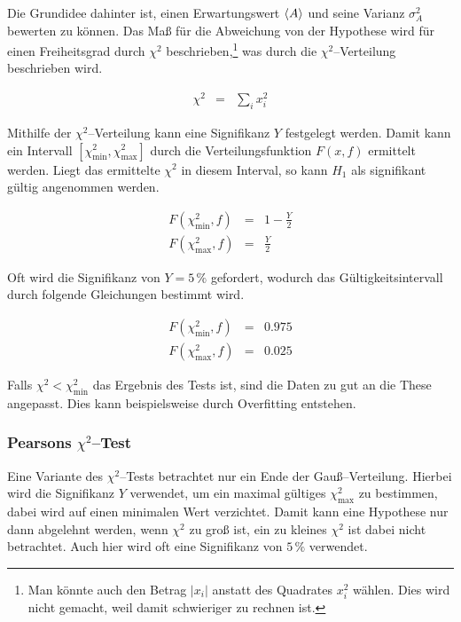 \documentclass[12pt,a4paper]{scrartcl}
\numberwithin{equation}{section} %
\begin{document}
Die Grundidee dahinter ist, einen Erwartungswert $\expval{A}$ und seine Varianz $\sigma_A^2$ bewerten zu können. Das Maß für die Abweichung von der Hypothese wird für einen Freiheitsgrad durch $\chi^2$ beschrieben,\footnote{Man könnte auch den Betrag $|x_i|$   anstatt des Quadrates $x_i^2$ wählen. Dies wird nicht gemacht, weil   damit schwieriger zu rechnen ist.} was durch die $\chi^2$--Verteilung beschrieben wird.

\begin{eqnarray}
    \chi^2 &=& \sum_i x_i^2
\end{eqnarray}

\noindent
Mithilfe der $\chi^2$--Verteilung kann eine Signifikanz $Y$ festgelegt werden. Damit kann ein Intervall $[\chi^2_\mathrm{min}, \chi^2_\mathrm{max}]$ durch die Verteilungsfunktion $F(x, f)$ ermittelt werden. Liegt das ermittelte $\chi^2$ in diesem Interval, so kann $H_1$ als signifikant gültig angenommen werden.

\begin{eqnarray}
    F(\chi^2_\mathrm{min}, f) &=& 1 - \frac{Y}{2} \\
    F(\chi^2_\mathrm{max}, f) &=& \frac{Y}{2}
\end{eqnarray}

\noindent
Oft wird die Signifikanz von $Y=5\,\%$ gefordert, wodurch das Gültigkeitsintervall durch folgende Gleichungen bestimmt wird.

\begin{eqnarray}
    F(\chi^2_\mathrm{min}, f) &=& 0.975 \label{eq:ChiMinFormula} \\
    F(\chi^2_\mathrm{max}, f) &=& 0.025 \label{eq:ChiMaxFormula}
\end{eqnarray}

\noindent
Falls $\chi^2<\chi^2_\mathrm{min}$ das Ergebnis des Tests ist, sind die Daten zu gut an die These angepasst. Dies kann beispielsweise durch Overfitting entstehen.

\hypertarget{pearsons-chi2test}{\subsubsection{Pearsons $\chi^2$--Test}\label{pearsons-chi2test}}

Eine Variante des $\chi^2$--Tests betrachtet nur ein Ende der Gauß--Verteilung. Hierbei wird die Signifikanz $Y$ verwendet, um ein maximal gültiges $\chi_\mathrm{max}^2$ zu bestimmen, dabei wird auf einen minimalen Wert verzichtet. \cite{McHugh} Damit kann eine Hypothese nur dann abgelehnt werden, wenn $\chi^2$ zu groß ist, ein zu kleines $\chi^2$ ist dabei nicht betrachtet. Auch hier wird oft eine Signifikanz von $5\,\%$ verwendet.
\end{document}
